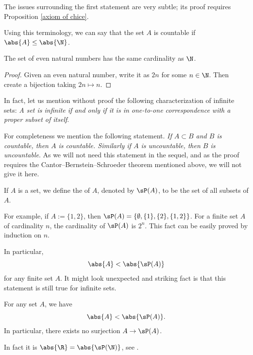 \documentclass[12pt]{book}
\begin{document}
The issues surrounding the first statement are very subtle;
its proof requires Proposition \ref{axiom of chice}.

Using this terminology, we can say that the set $A$ is countable if
$\abs{A} \le \abs{\N}$.

\begin{example}
The set of even natural numbers has the same cardinality as $\N$.  

\begin{proof}
Given an even natural number, write it as $2n$ for some $n \in \N$.  
Then create a bijection taking $2n\mapsto n$.
\end{proof}
\end{example}

In fact, let us mention without proof the following characterization
of infinite sets: \emph{A set is infinite if and only if it is in one-to-one
correspondence with a proper subset of itself}.

For completeness we mention the following statement.
\emph{If $A \subset
B$ and $B$ is countable, then $A$ is countable.
Similarly if $A$ is
uncountable, then $B$ is uncountable}.
As we will not need this statement in
the sequel, and as the proof requires the
Cantor--Bernstein--Schroeder theorem mentioned above, we will not give it
here.

\begin{defn}
If $A$ is a set,
we define the \emph{} of $A$, denoted by $\sP(A)$, to be
the set of all subsets of $A$.
\end{defn}

For example, if $A := \{ 1,2\}$, then $\sP(A) = \{ \emptyset, \{ 1 \}, \{ 2 \},
\{ 1, 2 \} \}$.  
For a finite set $A$ of cardinality $n$, the cardinality of $\sP(A)$ is $2^n$. 
This fact can be easily proved by induction on $n$.  

In particular, 
$$\abs{A} < \abs{\sP(A)}$$
for any finite set $A$.  
It might look unexpected and striking fact is that this statement is still true for infinite sets.

\begin{thm}
For any set $A$, we have
$$\abs{A} < \abs{\sP(A)}.$$  
In particular, there exists no surjection $A\to\sP(A)$.
\end{thm}

In fact it is $\abs{\R}=\abs{\sP(\N)}$, see .
\end{document}
